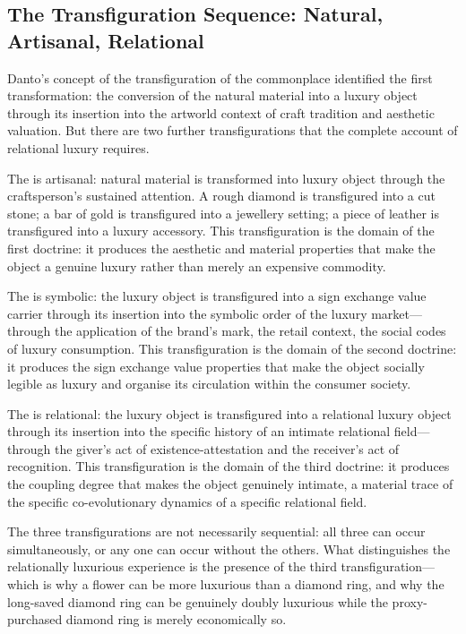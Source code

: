 \subsection{The Transfiguration Sequence: Natural, Artisanal, Relational}
\label{p16:subsec:transfiguration}

\noindent
Danto's concept of the transfiguration of the commonplace \parencite{danto1981} identified the first transformation: the conversion of the natural material into a luxury object through its insertion into the artworld context of craft tradition and aesthetic valuation. But there are two further transfigurations that the complete account of relational luxury requires.

The  is artisanal: natural material is transformed into luxury object through the craftsperson's sustained attention. A rough diamond is transfigured into a cut stone; a bar of gold is transfigured into a jewellery setting; a piece of leather is transfigured into a luxury accessory. This transfiguration is the domain of the first doctrine: it produces the aesthetic and material properties that make the object a genuine luxury rather than merely an expensive commodity.

The  is symbolic: the luxury object is transfigured into a sign exchange value carrier through its insertion into the symbolic order of the luxury market---through the application of the brand's mark, the retail context, the social codes of luxury consumption. This transfiguration is the domain of the second doctrine: it produces the sign exchange value properties that make the object socially legible as luxury and organise its circulation within the consumer society.

The  is relational: the luxury object is transfigured into a relational luxury object through its insertion into the specific history of an intimate relational field---through the giver's act of existence-attestation and the receiver's act of recognition. This transfiguration is the domain of the third doctrine: it produces the coupling degree that makes the object genuinely intimate, a material trace of the specific co-evolutionary dynamics of a specific relational field.

The three transfigurations are not necessarily sequential: all three can occur simultaneously, or any one can occur without the others. What distinguishes the relationally luxurious experience is the presence of the third transfiguration---which is why a flower can be more luxurious than a diamond ring, and why the long-saved diamond ring can be genuinely doubly luxurious while the proxy-purchased diamond ring is merely economically so.

